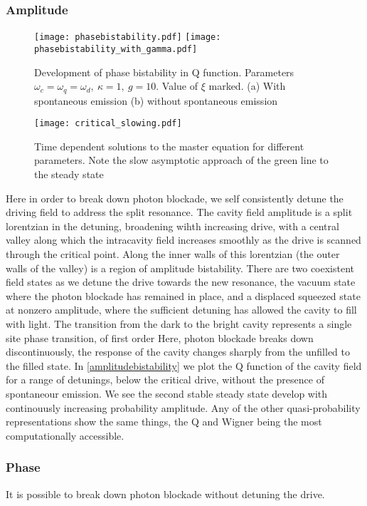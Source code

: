 \subsubsection{Amplitude}
\begin{figure*}[tbh]
  \texttt{[image: phasebistability.pdf]}
  \texttt{[image: phasebistability\_with\_gamma.pdf]}
  \caption{Development of phase bistability in Q function. Parameters $\omega_c = \omega_q = \omega_d ,\ \kappa=1,\ g=10$. Value of $\xi$ marked. (a) With spontaneous emission (b) without spontaneous emission}
  \label{phasebistability}
\end{figure*}
\begin{figure*}[bt]
  \texttt{[image: critical\_slowing.pdf]}
  \caption{Time dependent solutions to the master equation for different parameters. Note the slow asymptotic approach of the green line to the steady state}
  \label{critical_slowing}
\end{figure*}
Here in order to break down photon blockade, we self consistently detune the driving field to address the split resonance. 
The cavity field amplitude is a split lorentzian in the detuning, broadening wihth increasing drive, with a central valley along which the intracavity field increases smoothly as the drive is scanned through the critical point.
Along the inner walls of this lorentzian (the outer walls of the valley) is a region of amplitude bistability. 
There are two coexistent field states as we detune the drive towards the new resonance, the vacuum state where the photon blockade has remained in place, and a displaced squeezed state at nonzero amplitude, where the sufficient detuning has allowed the cavity to fill with light. 
The transition from the dark to the bright cavity represents a single site phase transition, of first order \cite{Carmichael2015}
Here, photon blockade breaks down discontinuously, the response of the cavity changes sharply from the unfilled to the filled state. 
In \cref{amplitudebistability} we plot the Q function of the cavity field for a range of detunings, below the critical drive, without the presence of spontaneour emission.
We see the second stable steady state develop with continouusly increasing probability amplitude. 
Any of the other quasi-probability representations show the same things, the Q and Wigner being the most computationally accessible. 
\subsubsection{Phase}
It is possible to break down photon blockade without detuning the drive.

